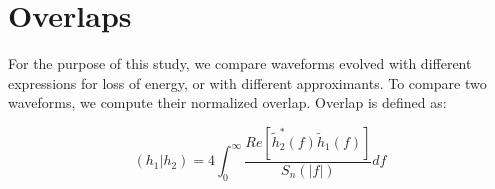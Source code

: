 \documentclass[aps,
prd,
amsmath,
amssymb,
twocolumn,
floatfix,
groupedaddress]{revtex4-1}
\def\l({\left(}
\def\r){\right)}
\begin{document}
%

\section{Overlaps}\label{sec:level1:Overlaps}
For the purpose of this study, we compare waveforms evolved with different expressions for loss of energy, or with different approximants. To compare two waveforms, we compute their normalized overlap. Overlap is defined as:

\begin{equation}
(h_1|h_2) = 4\int^{\infty}_0 \dfrac{Re\left[\tilde{h}_2^*(f) \tilde{h}_1(f)\right]}{S_n(|f|)} df
\end{equation}
\end{document}

